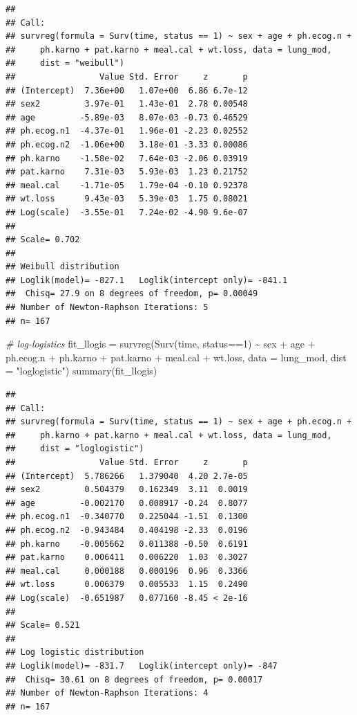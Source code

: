 \documentclass[
]{article}
\newenvironment{Shaded}{\begin{snugshade}}{\end{snugshade}}
\newcommand{\AttributeTok}[1]{\textcolor[rgb]{0.77,0.63,0.00}{#1}}
\newcommand{\CommentTok}[1]{\textcolor[rgb]{0.56,0.35,0.01}{\textit{#1}}}
\newcommand{\DecValTok}[1]{\textcolor[rgb]{0.00,0.00,0.81}{#1}}
\newcommand{\FunctionTok}[1]{\textcolor[rgb]{0.00,0.00,0.00}{#1}}
\newcommand{\NormalTok}[1]{#1}
\newcommand{\OtherTok}[1]{\textcolor[rgb]{0.56,0.35,0.01}{#1}}
\newcommand{\SpecialCharTok}[1]{\textcolor[rgb]{0.00,0.00,0.00}{#1}}
\newcommand{\StringTok}[1]{\textcolor[rgb]{0.31,0.60,0.02}{#1}}
\begin{document}
\begin{verbatim}
## 
## Call:
## survreg(formula = Surv(time, status == 1) ~ sex + age + ph.ecog.n + 
##     ph.karno + pat.karno + meal.cal + wt.loss, data = lung_mod, 
##     dist = "weibull")
##                 Value Std. Error     z       p
## (Intercept)  7.36e+00   1.07e+00  6.86 6.7e-12
## sex2         3.97e-01   1.43e-01  2.78 0.00548
## age         -5.89e-03   8.07e-03 -0.73 0.46529
## ph.ecog.n1  -4.37e-01   1.96e-01 -2.23 0.02552
## ph.ecog.n2  -1.06e+00   3.18e-01 -3.33 0.00086
## ph.karno    -1.58e-02   7.64e-03 -2.06 0.03919
## pat.karno    7.31e-03   5.93e-03  1.23 0.21752
## meal.cal    -1.71e-05   1.79e-04 -0.10 0.92378
## wt.loss      9.43e-03   5.39e-03  1.75 0.08021
## Log(scale)  -3.55e-01   7.24e-02 -4.90 9.6e-07
## 
## Scale= 0.702 
## 
## Weibull distribution
## Loglik(model)= -827.1   Loglik(intercept only)= -841.1
##  Chisq= 27.9 on 8 degrees of freedom, p= 0.00049 
## Number of Newton-Raphson Iterations: 5 
## n= 167
\end{verbatim}

\begin{Shaded}
\begin{Highlighting}[]
\CommentTok{\# log{-}logistics}
\NormalTok{fit\_llogis }\OtherTok{=} \FunctionTok{survreg}\NormalTok{(}\FunctionTok{Surv}\NormalTok{(time, status}\SpecialCharTok{==}\DecValTok{1}\NormalTok{) }\SpecialCharTok{\textasciitilde{}}\NormalTok{ sex }\SpecialCharTok{+}\NormalTok{ age }\SpecialCharTok{+}\NormalTok{ ph.ecog.n }\SpecialCharTok{+}\NormalTok{ ph.karno }\SpecialCharTok{+}\NormalTok{ pat.karno }\SpecialCharTok{+}\NormalTok{ meal.cal }\SpecialCharTok{+}\NormalTok{ wt.loss,}
                     \AttributeTok{data =}\NormalTok{ lung\_mod, }\AttributeTok{dist =} \StringTok{"loglogistic"}\NormalTok{)}
\FunctionTok{summary}\NormalTok{(fit\_llogis)}
\end{Highlighting}
\end{Shaded}

\begin{verbatim}
## 
## Call:
## survreg(formula = Surv(time, status == 1) ~ sex + age + ph.ecog.n + 
##     ph.karno + pat.karno + meal.cal + wt.loss, data = lung_mod, 
##     dist = "loglogistic")
##                 Value Std. Error     z       p
## (Intercept)  5.786266   1.379040  4.20 2.7e-05
## sex2         0.504379   0.162349  3.11  0.0019
## age         -0.002170   0.008917 -0.24  0.8077
## ph.ecog.n1  -0.340770   0.225044 -1.51  0.1300
## ph.ecog.n2  -0.943484   0.404198 -2.33  0.0196
## ph.karno    -0.005662   0.011388 -0.50  0.6191
## pat.karno    0.006411   0.006220  1.03  0.3027
## meal.cal     0.000188   0.000196  0.96  0.3366
## wt.loss      0.006379   0.005533  1.15  0.2490
## Log(scale)  -0.651987   0.077160 -8.45 < 2e-16
## 
## Scale= 0.521 
## 
## Log logistic distribution
## Loglik(model)= -831.7   Loglik(intercept only)= -847
##  Chisq= 30.61 on 8 degrees of freedom, p= 0.00017 
## Number of Newton-Raphson Iterations: 4 
## n= 167
\end{verbatim}
\end{document}
